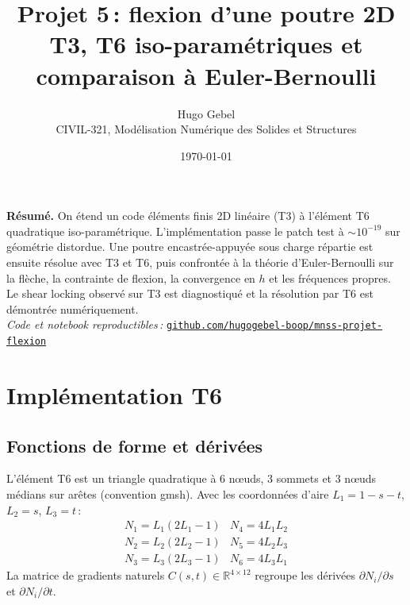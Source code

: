 \documentclass[a4paper,10pt]{article}
\title{\vspace{-2em}%
  {\LARGE\bfseries\color{ink} Projet 5\,: flexion d'une poutre 2D}\\[3pt]
  {\large T3, T6 iso-paramétriques et comparaison à Euler-Bernoulli}}
\author{\normalsize Hugo Gebel\\[1pt]
        \small\color{soft} CIVIL-321, Modélisation Numérique des Solides et Structures}
\date{\small\color{soft}\today}
\begin{document}
\maketitle
\thispagestyle{fancy}

\noindent\colorbox{ink!5}{%
\begin{minipage}{\dimexpr\linewidth-2\fboxsep}\small
\textbf{Résumé.} On étend un code éléments finis 2D linéaire (T3) à
l'élément T6 quadratique iso-paramétrique. L'implémentation passe le
patch test à $\sim 10^{-19}$ sur géométrie distordue. Une poutre
encastrée-appuyée sous charge répartie est ensuite résolue avec T3 et
T6, puis confrontée à la théorie d'Euler-Bernoulli sur la flèche, la
contrainte de flexion, la convergence en $h$ et les fréquences propres.
Le shear locking observé sur T3 est diagnostiqué et la résolution par
T6 est démontrée numériquement.\\[2pt]
\textit{Code et notebook reproductibles\,:}
\href{https://github.com/hugogebel-boop/mnss-projet-flexion}{\texttt{github.com/hugogebel-boop/mnss-projet-flexion}}
\end{minipage}}

\section{Implémentation T6}

\subsection{Fonctions de forme et dérivées}
L'élément T6 est un triangle quadratique à 6 nœuds, 3 sommets et 3 nœuds
médians sur arêtes (convention gmsh). Avec les coordonnées d'aire
$L_1 = 1{-}s{-}t$, $L_2 = s$, $L_3 = t$\,:
\[
\begin{array}{ll}
N_1 = L_1(2L_1{-}1) & N_4 = 4 L_1 L_2\\[1pt]
N_2 = L_2(2L_2{-}1) & N_5 = 4 L_2 L_3\\[1pt]
N_3 = L_3(2L_3{-}1) & N_6 = 4 L_3 L_1
\end{array}
\]
La matrice de gradients naturels $C(s,t)\in\mathbb{R}^{4\times 12}$
regroupe les dérivées $\partial N_i/\partial s$ et $\partial N_i/\partial t$.
\end{document}
